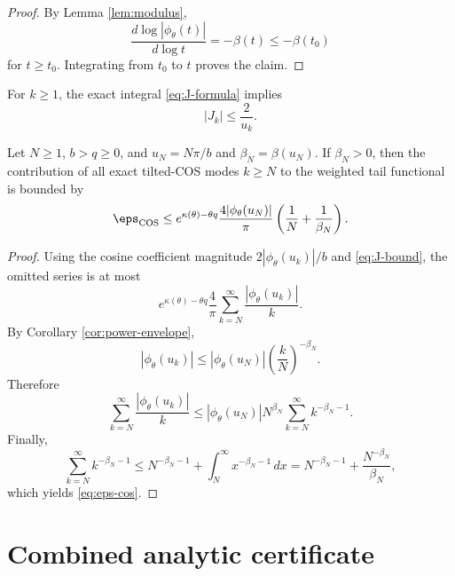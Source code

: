 \begin{proof}
By Lemma \ref{lem:modulus},
\[
\frac{d\log|\phi_{\theta}(t)|}{d\log t}=-\beta(t)\le-\beta(t_0)
\]
for $t\ge t_0$. Integrating from $t_0$ to $t$ proves the claim.
\end{proof}

For $k\ge1$, the exact integral \eqref{eq:J-formula} implies
\begin{equation}
|J_k|
\le \frac{2}{u_k}.
\label{eq:J-bound}
\end{equation}

\begin{theorem}
\label{thm:cos-tail}
Let $N\ge1$, $b>q\ge0$, and $u_N=N\pi/b$ and $\beta_N=\beta(u_N)$. If $\beta_N>0$, then the contribution of all exact tilted-COS modes $k\ge N$ to the weighted tail functional is bounded by
\begin{equation}
\eps_{\mathrm{COS}}
\le
 e^{\kappa(\theta)-\theta q}
\frac{4|\phi_{\theta}(u_N)|}{\pi}
\left(\frac1N+\frac1{\beta_N}\right).
\label{eq:eps-cos}
\end{equation}
\end{theorem}

\begin{proof}
Using the cosine coefficient magnitude $2|\phi_{\theta}(u_k)|/b$ and \eqref{eq:J-bound}, the omitted series is at most
\[
e^{\kappa(\theta)-\theta q}
\frac{4}{\pi}
\sum_{k=N}^{\infty}\frac{|\phi_{\theta}(u_k)|}{k}.
\]
By Corollary \ref{cor:power-envelope},
\[
|\phi_{\theta}(u_k)|
\le
|\phi_{\theta}(u_N)|\left(\frac{k}{N}\right)^{-\beta_N}.
\]
Therefore
\[
\sum_{k=N}^{\infty}\frac{|\phi_{\theta}(u_k)|}{k}
\le
|\phi_{\theta}(u_N)|N^{\beta_N}
\sum_{k=N}^{\infty}k^{-\beta_N-1}.
\]
Finally,
\[
\sum_{k=N}^{\infty}k^{-\beta_N-1}
\le N^{-\beta_N-1}+\int_N^{\infty}x^{-\beta_N-1}\,dx
=N^{-\beta_N-1}+\frac{N^{-\beta_N}}{\beta_N},
\]
which yields \eqref{eq:eps-cos}.
\end{proof}

\section{Combined analytic certificate}

